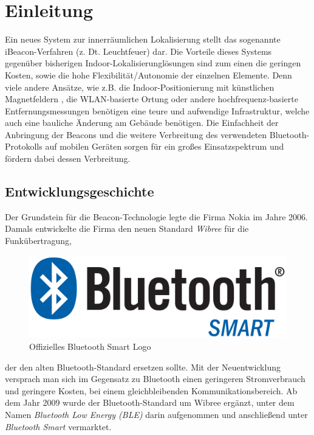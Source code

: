 \chapter{Einleitung}
Ein neues System zur innerräumlichen Lokalisierung stellt das sogenannte iBeacon-Verfahren (z. Dt. Leuchtfeuer) dar. Die Vorteile dieses Systems gegenüber bisherigen Indoor-Lokalisierunglösungen sind zum einen die geringen Kosten, sowie die hohe Flexibilität/Autonomie der einzelnen Elemente. Denn viele andere Ansätze, wie z.B. die Indoor-Positionierung mit künstlichen Magnetfeldern \cite{Magnet}, die WLAN-basierte Ortung \citep{WLAN} oder andere hochfrequenz-basierte Entfernungsmessungen benötigen eine teure und aufwendige Infrastruktur, welche auch eine bauliche Änderung am Gebäude benötigen. Die Einfachheit der Anbringung der Beacons und die weitere Verbreitung des verwendeten Bluetooth-Protokolls auf mobilen Geräten sorgen für ein großes Einsatzspektrum und fördern dabei dessen Verbreitung. 


\section{Entwicklungsgeschichte}
Der Grundstein für die Beacon-Technologie legte die Firma Nokia im Jahre 2006. Damals entwickelte die Firma den neuen Standard \textit{Wibree} für die Funkübertragung,
\begin{figure}
\centering
\includegraphics[scale=0.07]{Bilder/BLE.png} 
\caption{Offizielles Bluetooth Smart Logo \cite{BLElogo}}
\label{BLElogo}
\end{figure} der den alten Bluetooth-Standard ersetzen sollte. Mit der Neuentwicklung versprach man sich im Gegensatz zu Bluetooth einen geringeren Stromverbrauch und geringere Kosten, bei einem gleichbleibenden Kommunikationsbereich. Ab dem Jahr 2009 wurde der Bluetooth-Standard um Wibree ergänzt, unter dem Namen \textit{Bluetooth Low Energy (BLE)} darin aufgenommen \cite{Wib2BLE} und anschließend unter \textit{Bluetooth Smart} vermarktet.

\vspace{2\baselineskip}

